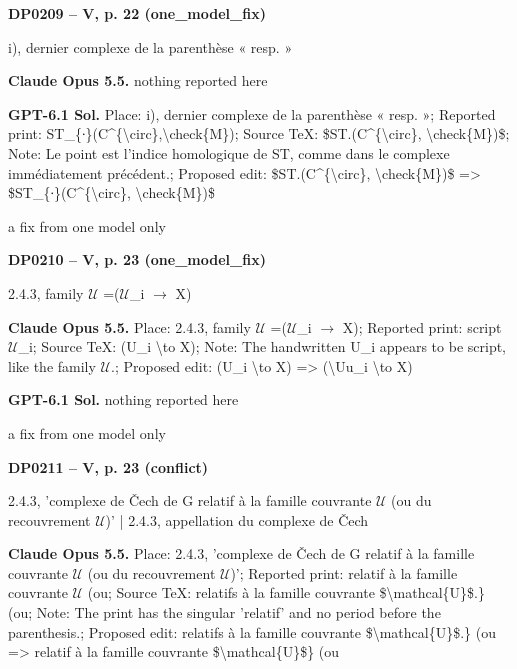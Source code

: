 \par\noindent\hypertarget{DP0209}{}\textbf{DP0209 -- V, p. 22 (one\_model\_fix)}\par
i), dernier complexe de la parenthèse « resp. »\par
\textbf{Claude Opus 5.5.} nothing reported here\par
\textbf{GPT-6.1 Sol.} Place: i), dernier complexe de la parenthèse « resp. »; Reported print: ST\_\{∙\}(C\textasciicircum{}\{\textbackslash{}circ\},\textbackslash{}check\{M\}); Source TeX: \$ST.(C\textasciicircum{}\{\textbackslash{}circ\}, \textbackslash{}check\{M\})\$; Note: Le point est l'indice homologique de ST, comme dans le complexe immédiatement précédent.; Proposed edit: \$ST.(C\textasciicircum{}\{\textbackslash{}circ\}, \textbackslash{}check\{M\})\$ =\allowbreak > \$ST\_\{∙\}(C\textasciicircum{}\{\textbackslash{}circ\}, \textbackslash{}check\{M\})\$\par
a fix from one model only\par
\par\noindent\hypertarget{DP0210}{}\textbf{DP0210 -- V, p. 23 (one\_model\_fix)}\par
2.4.3, family \ensuremath{𝒰} =\allowbreak  (\ensuremath{𝒰}\_i \ensuremath{\to} X)\par
\textbf{Claude Opus 5.5.} Place: 2.4.3, family \ensuremath{𝒰} =\allowbreak  (\ensuremath{𝒰}\_i \ensuremath{\to} X); Reported print: script \ensuremath{𝒰}\_i; Source TeX: (U\_i \textbackslash{}to X); Note: The handwritten U\_i appears to be script, like the family \ensuremath{𝒰}.; Proposed edit: (U\_i \textbackslash{}to X) =\allowbreak > (\textbackslash{}Uu\_i \textbackslash{}to X)\par
\textbf{GPT-6.1 Sol.} nothing reported here\par
a fix from one model only\par
\par\noindent\hypertarget{DP0211}{}\textbf{DP0211 -- V, p. 23 (conflict)}\par
2.4.3, 'complexe de Čech de G relatif à la famille couvrante \ensuremath{𝒰} (ou du recouvrement \ensuremath{𝒰})' | 2.4.3, appellation du complexe de Čech\par
\textbf{Claude Opus 5.5.} Place: 2.4.3, 'complexe de Čech de G relatif à la famille couvrante \ensuremath{𝒰} (ou du recouvrement \ensuremath{𝒰})'; Reported print: relatif à la famille couvrante \ensuremath{𝒰} (ou; Source TeX: relatifs à la famille couvrante \$\textbackslash{}mathcal\{U\}\$.\} (ou; Note: The print has the singular 'relatif' and no period before the parenthesis.; Proposed edit: relatifs à la famille couvrante \$\textbackslash{}mathcal\{U\}\$.\} (ou =\allowbreak > relatif à la famille couvrante \$\textbackslash{}mathcal\{U\}\$\} (ou\par
